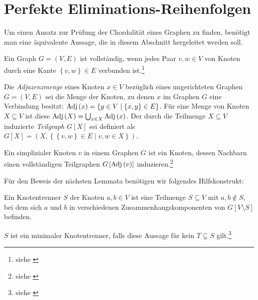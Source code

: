 \section{Perfekte Eliminations-Reihenfolgen}
Um einen Ansatz zur Prüfung der Chordalität eines Graphen zu finden, benötigt man eine äquivalente Aussage, die in diesem Abschnitt hergeleitet werden soll.

\begin{definition}
	Ein Graph \( G = \left( V, E \right) \) ist vollständig, wenn jedes Paar \( v, w \in V \) von Knoten durch eine Kante \( \left\lbrace v, w \right\rbrace \in E \) verbunden ist.\footnote{siehe \cite[Kapitel 1.1]{golumbic}}
\end{definition}

Die \textit{Adjazenzmenge} eines Knoten \( x \in V \) bezüglich eines ungerichteten Graphen \( G = \left( V, E \right) \) sei die Menge der Knoten, zu denen \( x \) im Graphen \( G \) eine Verbindung besitzt: \( \textnormal{Adj} \left( x \right) = \left\lbrace y \in V \mid \left\lbrace x, y \right\rbrace \in E \right\rbrace \). Für eine Menge von Knoten \( X \subseteq V \) ist diese \( \textnormal{Adj} \left( X \right) = \bigcup_{x \in X} \textnormal{Adj} \left( x \right) \). Der durch die Teilmenge \( X \subseteq V \) induzierte \textit{Teilgraph} \( G \left[ X \right] \) sei definiert als \( G \left[ X \right] = \left( X, \left\lbrace \left\lbrace v, w \right\rbrace \in E \mid v, w \in X \right\rbrace \right) \).

\begin{definition}
	Ein simplizialer Knoten \( v \) in einem Graphen \( G \) ist ein Knoten, dessen Nachbarn einen vollständigen Teilgraphen \( G \left[\textnormal{Adj} \left( v \right) \right] \) induzieren.\footnote{siehe \cite[Kapitel 4.2]{golumbic}}
\end{definition}

Für den Beweis der nächsten Lemmata benötigen wir folgendes Hilfskonstrukt:

\begin{definition}
	Ein Knotentrenner \( S \) der Knoten \( a, b \in V \) ist eine Teilmenge \( S \subseteq V \) mit \( a, b \not\in S \), bei dem sich \( a \) und \( b \) in verschiedenen Zusammenhangskomponenten von \( G \left[ V \setminus S \right] \) befinden.

	\( S \) ist ein minimaler Knotentrenner, falls diese Aussage für kein \( T \subsetneq S \) gilt.\footnote{siehe \cite[Kapitel 4.2]{golumbic}}
\end{definition}

